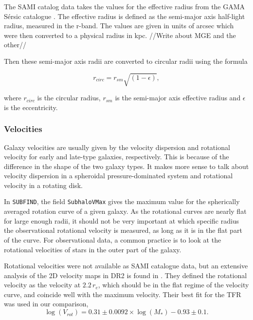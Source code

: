 The SAMI catalog data takes the values for the effective radius from the GAMA Sérsic catalogue \parencite{Driver2011}. The effective radius is defined as the semi-major axis half-light radius, measured in the r-band. The values are given in units of arcsec which were then converted to a physical radius in kpc. //Write about MGE and the other// 

Then these semi-major axis radii are converted to circular radii using the formula

\begin{equation}
   r_{circ} = r_{sm}\sqrt{(1-\epsilon)},
\end{equation}

where $r_{circ}$ is the circular radius, $r_{sm}$ is the semi-major axis effective radius and $\epsilon$ is the eccentricity.


\subsubsection{Velocities}

Galaxy velocities are usually given by the velocity dispersion and rotational velocity for early and late-type galaxies, respectively. This is because of the difference in the shape of the two galaxy types. It makes more sense to talk about velocity dispersion in a spheroidal pressure-dominated system and rotational velocity in a rotating disk.

In \texttt{SUBFIND}, the field \texttt{SubhaloVMax} gives the maximum value for the spherically averaged rotation curve of a given galaxy. As the rotational curves are nearly flat for large enough radii, it should not be very important at which specific radius the observational rotational velocity is measured, as long as it is in the flat part of the curve. For observational data, a common practice is to look at the rotational velocities of stars in the outer part of the galaxy. 

Rotational velocities were not available as SAMI catalogue data, but an extensive analysis of the 2D velocity maps in DR2 is found in \textcite{Bloom2017}. They defined the rotational velocity as the velocity at $2.2\, r_e$, which should be in the flat regime of the velocity curve, and coincide well with the maximum velocity. Their best fit for the TFR was used in our comparison, 
\begin{equation}
	\log(V_{rot}) = 0.31 \pm 0.0092 \times \log(M_*)-0.93 \pm 0.1.
\end{equation}

